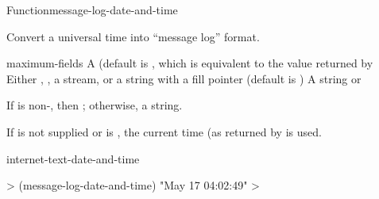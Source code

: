 \documentclass[10pt,twoside,english,pdftex]{article}
\begin{document}
\begin{functiondoc}{Function}{message-log-date-and-time}{%
      
      
   \returns{} }
% 

\fnsyntax

\fnpurpose Convert a universal time into ``message log''
 format.

\fnpackage {}

\fnmodule {}

\fnargs
\begin{args}{maximum-fields}
 A  (default is \nil,
  which is equivalent to the value returned by
\arg[destination] Either \nil, , a stream, or a string with a fill 
pointer (default is \nil)
\arg[result] A string or \nil{}
\end{args}

\fnreturns If  is non-\nil, then \nil; otherwise, a string.

\fndescription
{}%
%
If  is not supplied or is \nil, the current time
(as returned by  is used.

\begin{alsos}{internet-text-date-and-time}
\end{alsos}

\fnexample
%
\W\supp
\begin{example}
  > (message-log-date-and-time)
  "May 17 04:02:49"
  >
\end{example}

\end{functiondoc}

\end{document}
